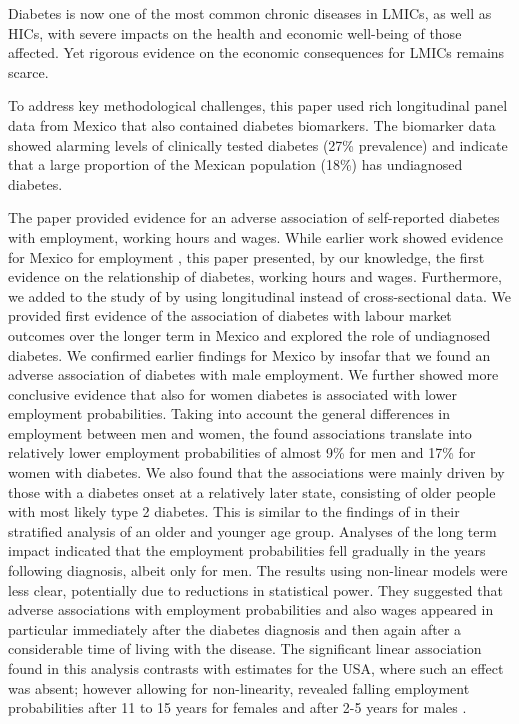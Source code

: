 \documentclass[12pt,english]{article}
\begin{document}
Diabetes is now one of the most common chronic diseases in \acp{LMIC}, as well as \acp{HIC}, with severe impacts on the health and economic well-being of those affected.  Yet rigorous evidence on the economic consequences for \acp{LMIC} remains scarce.

To address key methodological challenges, this paper used rich longitudinal panel data from Mexico that also contained diabetes biomarkers. The biomarker data showed alarming levels of clinically tested diabetes (27\% prevalence) and indicate that a large proportion of the Mexican population (18\%) has undiagnosed diabetes.

The paper provided evidence for an adverse association of self-reported diabetes with employment, working hours and wages. While earlier work showed evidence for Mexico for employment \parencite{Seuring2015}, this paper presented, by our knowledge, the first evidence on the relationship of diabetes, working hours and wages. Furthermore, we added to the study of \textcite{Seuring2015} by using longitudinal instead of cross-sectional data. We provided first evidence of the association of diabetes with labour market outcomes over the longer term in Mexico and explored the role of undiagnosed diabetes. We confirmed earlier findings for Mexico by \textcite{Seuring2015} insofar that we found an adverse association of diabetes with male employment. We further showed more conclusive evidence that also for women diabetes is associated with lower employment probabilities. Taking into account the general differences in employment between men and women, the found associations translate into relatively lower employment probabilities of almost 9\% for men and 17\% for women with diabetes. We also found that the associations were mainly driven by those with a diabetes onset at a relatively later state, consisting of older people with most likely type 2 diabetes. This is similar to the findings of \textcite{Seuring2015} in their stratified analysis of an older and younger age group. Analyses of the long term impact indicated that the employment probabilities fell gradually in the years following diagnosis, albeit only for men. The results using non-linear models were less clear, potentially due to reductions in statistical power. They suggested that adverse associations with employment probabilities and also wages appeared in particular immediately after the diabetes diagnosis and then again after a considerable time of living with the disease. The significant linear association found in this analysis contrasts with estimates for the USA, where such an effect was absent; however allowing for non-linearity, revealed falling employment probabilities after 11 to 15 years for females and after 2-5 years for males \parencite{Minor2013}.
\end{document}
